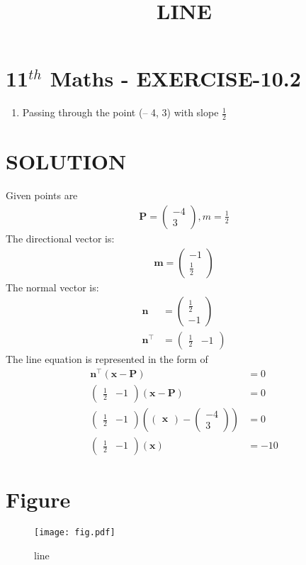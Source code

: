 \documentclass[12pt]{article}
\providecommand{\brak}[1]{\ensuremath{\left(#1\right)}}
\newcommand{\myvec}[1]{\ensuremath{\begin{pmatrix}#1\end{pmatrix}}}
\let\vec\mathbf
\begin{document}
\begin{center}
\title{\textbf{LINE}}
\date{\vspace{-5ex}} %
\maketitle
\end{center}

\section{11$^{th}$ Maths - EXERCISE-10.2}
\begin{enumerate}
\item Passing through the point (– 4, 3) with slope $\frac{1}{2}$
\end{enumerate}
\section{SOLUTION}
Given points are 
\begin{align}
\vec{P}=\myvec{-4\\ 3},
m=\frac{1}{2}
\end{align}
The directional vector is:
\begin{align}
\vec{m}=\myvec{-1\\ \frac{1}{2}}
\end{align}
The normal vector is:
\begin{align}
\vec{n}&=\myvec{\frac{1}{2}\\ -1}\\
	\vec{n}^\top&=\myvec{\frac{1}{2}& -1}	
\end{align}
The line equation is represented in the form of 
\begin{align}
\vec{n}^\top \brak{\vec{x}-\vec{P}}&= 0 \\
\myvec{\frac{1}{2}& -1}\brak{\vec{x}-\vec{P}}&=0\\ 
\myvec{\frac{1}{2}& -1}\brak{\myvec{\vec{x}}-\myvec{-4\\3}}&=0\\   
\myvec{\frac{1}{2}& -1}\brak{\vec{x}}&=-10
\end{align}
\section{Figure}
\begin{figure}[h]
\centering
\texttt{[image: fig.pdf]}
\caption{line}
		\label{fig:Figure}
\end{figure}
\end{document}
